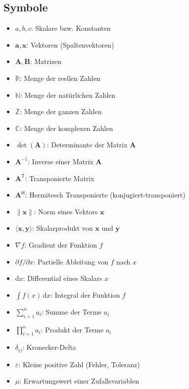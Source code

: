 \subsection*{Symbole}
\begin{itemize}[label=$\bullet$]
    \item \textbf{$a, b, c$}: Skalare bzw. Konstanten
    \item \textbf{$\mathbf{a}, \mathbf{x}$}: Vektoren (Spaltenvektoren)
    \item \textbf{$\mathbf{A}, \mathbf{B}$}: Matrizen
    \item \textbf{$\mathbb{R}$}: Menge der reellen Zahlen
    \item \textbf{$\mathbb{N}$}: Menge der natürlichen Zahlen
    \item \textbf{$\mathbb{Z}$}: Menge der ganzen Zahlen
    \item \textbf{$\mathbb{C}$}: Menge der komplexen Zahlen
    \item \textbf{$\det(\mathbf{A})$}: Determinante der Matrix $\mathbf{A}$
    \item \textbf{$\mathbf{A}^{-1}$}: Inverse einer Matrix $\mathbf{A}$
    \item \textbf{$\mathbf{A}^\mathsf{T}$}: Transponierte Matrix
    \item \textbf{$\mathbf{A}^\mathsf{H}$}: Hermitesch Transponierte (konjugiert-transponiert)
    \item \textbf{$\|\mathbf{x}\|$}: Norm eines Vektors $\mathbf{x}$
    \item \textbf{$\langle \mathbf{x}, \mathbf{y} \rangle$}: Skalarprodukt von $\mathbf{x}$ und $\mathbf{y}$
    \item \textbf{$\nabla f$}: Gradient der Funktion $f$
    \item \textbf{$\partial f / \partial x$}: Partielle Ableitung von $f$ nach $x$
    \item \textbf{$\mathrm{d}x$}: Differential eines Skalars $x$
    \item \textbf{$\int f(x)\,\mathrm{d}x$}: Integral der Funktion $f$
    \item \textbf{$\sum_{i=1}^{n} a_i$}: Summe der Terme $a_i$
    \item \textbf{$\prod_{i=1}^{n} a_i$}: Produkt der Terme $a_i$
    \item \textbf{$\delta_{ij}$}: Kronecker-Delta
    \item \textbf{$\varepsilon$}: Kleine positive Zahl (Fehler, Toleranz)
    \item \textbf{$\mu$}: Erwartungswert einer Zufallsvariablen

\end{itemize}
